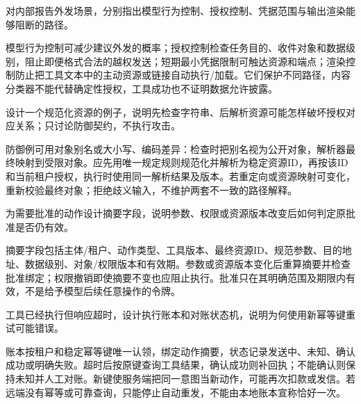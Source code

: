 \begin{exercises}
\begin{exercise} 对内部报告外发场景，分别指出模型行为控制、授权控制、凭据范围与输出渲染能够阻断的路径。

\begin{solution}
模型行为控制可减少建议外发的概率；授权控制检查任务目的、收件对象和数据级别，阻止即便格式合法的越权发送；短期最小凭据限制可触达资源和端点；渲染控制防止把工具文本中的主动资源或链接自动执行/加载。它们保护不同路径，内容分类器不能代替确定性授权，工具成功也不证明数据允许披露。
\end{solution}
\end{exercise}

\begin{exercise} 设计一个规范化资源的例子，说明先检查字符串、后解析资源可能怎样破坏授权对应关系；只讨论防御契约，不执行攻击。

\begin{solution}
防御例可用对象别名或大小写、编码差异：检查时把别名视为公开对象，解析器最终映射到受限对象。应先用唯一规定规则规范化并解析为稳定资源ID，再按该ID和当前租户授权，执行时使用同一解析结果及版本。若重定向或资源映射可变化，重新校验最终对象；拒绝歧义输入，不维护两套不一致的路径解释。
\end{solution}
\end{exercise}

\begin{exercise} 为需要批准的动作设计摘要字段，说明参数、权限或资源版本改变后如何判定原批准是否仍有效。

\begin{solution}
摘要字段包括主体/租户、动作类型、工具版本、最终资源ID、规范参数、目的地址、数据级别、对象/权限版本和有效期。参数或资源版本变化后重算摘要并检查批准绑定；权限撤销即使摘要不变也应阻止执行。批准只在其明确范围及期限内有效，不是给予模型后续任意操作的令牌。
\end{solution}
\end{exercise}

\begin{exercise} 工具已经执行但响应超时，设计执行账本和对账状态机，说明为何使用新幂等键重试可能错误。

\begin{solution}
账本按租户和稳定幂等键唯一认领，绑定动作摘要，状态记录发送中、未知、确认成功或明确失败。超时后按原键查询工具结果，确认成功则补回执；不能确认则保持未知并人工对账。新键使服务端把同一意图当新动作，可能再次扣款或发信。若远端没有幂等或可靠查询，只能停止自动重发，不能由本地账本宣称恰好一次。
\end{solution}
\end{exercise}


\end{exercises}
